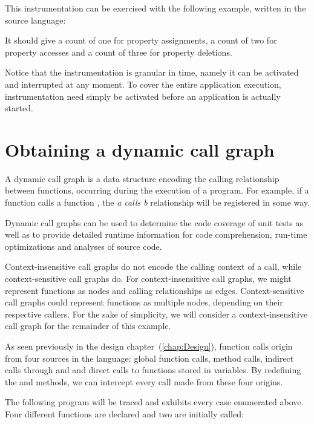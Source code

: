 
This instrumentation can be exercised with the following example, written in
the source language:


It should give a count of one for property assignments, a count of two for
property accesses and a count of three for property deletions.

Notice that the instrumentation is granular in time, namely it can be activated
and interrupted at any moment.  To cover the entire application execution,
instrumentation need simply be activated before an application is actually
started. 

\section{Obtaining a dynamic call graph}

A dynamic call graph is a data structure encoding the calling relationship
between functions, occurring during the execution of a program. For example, if
a function  calls a function , the \textit{a calls b} relationship
will be registered in some way. 

Dynamic call graphs can be used to determine the code coverage of unit tests as
well as to provide detailed runtime information for code comprehension,
run-time optimizations and analyses of source code. 

Context-insensitive call graphs do not encode the calling context of a call,
while context-sensitive call graphs do. For context-insensitive call graphs, we
might represent functions as nodes and calling relationships as edges.
Context-sensitive call graphs could represent functions as multiple nodes,
depending on their respective callers. For the sake of simplicity, we will
consider a context-insensitive call graph for the remainder of this example. 

As seen previously in the design chapter~(\ref{chap:Design}), function calls
origin from four sources in the language: global function calls, method calls,
indirect calls through  and  and direct calls to functions
stored in variables. By redefining the  and  methods, we can
intercept every call made from these four origins.

The following program will be traced and exhibits every case enumerated
above. Four different functions are declared and two are initially called:

